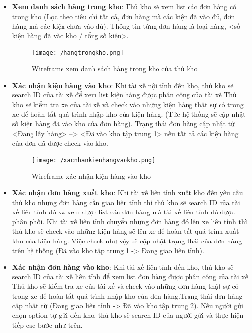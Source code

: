 \begin{itemize}
	
	\begin{itemize}
		\item \textbf{Xem danh sách hàng trong kho}: Thủ kho sẽ xem list các đơn hàng có trong kho (Lọc theo tiêu chí tất cả, đơn hàng mà các kiện đã vào đủ, đơn hàng mà các kiện chưa vào đủ). Thông tin từng đơn hàng là loại hàng, <số kiện hàng đã vào kho / tổng số kiện>. 
		
		\begin{figure}[!ht]
			\texttt{[image: /hangtrongkho.png]}
			\centering
			\linebreak
			\caption{Wireframe xem danh sách hàng trong kho của thủ kho}
		\end{figure}
		
		\item \textbf{Xác nhận kiện hàng vào kho}:
		Khi tài xế nội tỉnh đến kho, thủ kho sẽ search ID của tài xế để xem list kiện hàng được phân công của tài xế Thủ kho sẽ kiểm tra xe của tài xế và check vào những kiện hàng thật sự có trong xe để hoàn tất quá trình nhập kho của kiện hàng. (Tức hệ thống sẽ cập nhật số kiện hàng đã vào kho của đơn hàng). Trạng thái đơn hàng cập nhật từ <Đang lấy hàng>  -->  <Đã vào kho tập trung 1>  nếu tất cả các kiện hàng của đơn đã được check vào kho. 
		
		\begin{figure}[!ht]
			\texttt{[image: /xacnhankienhangvaokho.png]}
			\centering
			\linebreak
			\caption{Wireframe xác nhận kiện hàng vào kho}
		\end{figure}
		
		\item \textbf{Xác nhận đơn hàng xuất kho}: Khi tài xế liên tỉnh xuất kho đến yêu cầu thủ kho những đơn hàng cần giao liên tỉnh thì thủ kho sẽ search ID của tài xế liên tỉnh đó và xem được list các đơn hàng mà tài xế liên tỉnh đó được phân phối. Khi tài xế liên tỉnh chuyển những đơn hàng đó lên xe liên tỉnh thì thủ kho sẽ check vào những kiện hàng sẽ lên xe để hoàn tất quá trình xuất kho của kiện hàng. Việc check như vậy sẽ cập nhật trạng thái của đơn hàng trên hệ thống (Đã vào kho tập trung 1 -> Đang giao liên tỉnh).
		\item \textbf{Xác nhận đơn hàng vào kho}: Khi tài xế liên tỉnh đến kho, thủ kho sẽ search ID của tài xế liên tỉnh để xem list đơn hàng được phân công của tài xế Thủ kho sẽ kiểm tra xe của tài xế và check vào những đơn hàng thật sự có trong xe để hoàn tất quá trình nhập kho của đơn hàng.Trạng thái đơn hàng cập nhật từ (Đang giao liên tỉnh -> Đã vào kho tập trung 2). Nếu người gửi chọn option tự gửi đến kho, thủ kho sẽ search ID của người gửi và thực hiện tiếp các bước như trên. 
		

\end{itemize}
\end{itemize}
